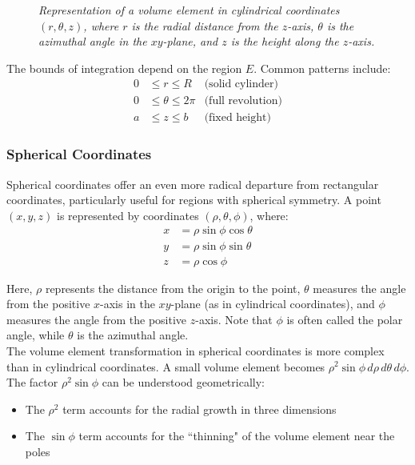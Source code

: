 \begin{figure}[H]
\caption{\textit{Representation of a volume element in cylindrical coordinates \((r, \theta, z)\), where \(r\) is the radial distance from the \(z\)-axis, \(\theta\) is the azimuthal angle in the \(xy\)-plane, and \(z\) is the height along the \(z\)-axis.}}
\end{figure}

\noindent The bounds of integration depend on the region $E$. Common patterns include:
\begin{align*}
0 &\leq r \leq R & \text{(solid cylinder)} \\
0 &\leq \theta \leq 2\pi & \text{(full revolution)} \\
a &\leq z \leq b & \text{(fixed height)}
\end{align*}

\subsubsection*{Spherical Coordinates}

\noindent Spherical coordinates offer an even more radical departure from rectangular coordinates, particularly useful for regions with spherical symmetry. A point $(x,y,z)$ is represented by coordinates $(\rho,\theta,\phi)$, where:
\begin{align*}
x &= \rho\sin\phi\cos\theta \\
y &= \rho\sin\phi\sin\theta \\
z &= \rho\cos\phi
\end{align*}

\noindent Here, $\rho$ represents the distance from the origin to the point, $\theta$ measures the angle from the positive $x$-axis in the $xy$-plane (as in cylindrical coordinates), and $\phi$ measures the angle from the positive $z$-axis. Note that $\phi$ is often called the polar angle, while $\theta$ is the azimuthal angle. \\

\noindent The volume element transformation in spherical coordinates is more complex than in cylindrical coordinates. A small volume element becomes $\rho^2\sin\phi\,d\rho\,d\theta\,d\phi$. The factor $\rho^2\sin\phi$ can be understood geometrically:
\begin{itemize}
   \item The $\rho^2$ term accounts for the radial growth in three dimensions
   \item The $\sin\phi$ term accounts for the ``thinning" of the volume element near the poles
\end{itemize}

